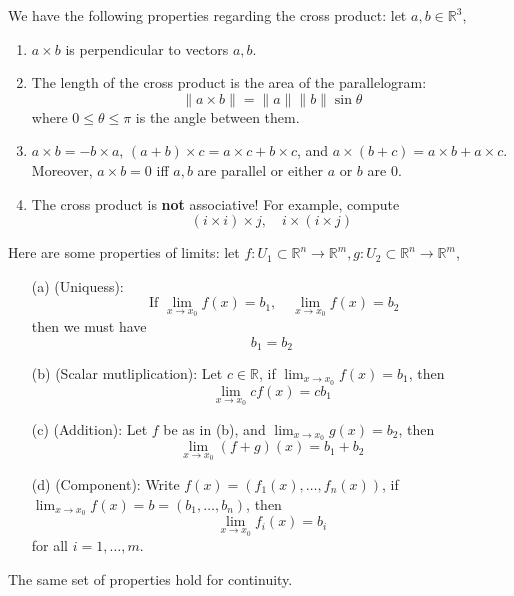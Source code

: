 \documentclass[openany]{book}
\newcommand{\R}{\mathbb{R}}
\begin{document}
\begin{prop}
    We have the following properties regarding the cross product: let $a,b\in\R^3$,
    \begin{enumerate}
        \item $a\times b$ is perpendicular to vectors $a,b$.
        \item The length of the cross product is the area of the parallelogram:
        \begin{equation*}
            \|a\times b\|=\|a\|\|b\|\sin\theta
        \end{equation*}
        where $0\leq\theta\leq\pi$ is the angle between them. 
        \item $a\times b=-b\times a$, $(a+b)\times c=a\times c+b\times c$, and $a\times (b+c)=a\times b+a\times c$. Moreover, $a\times b=0$ iff $a,b$ are parallel or either $a$ or $b$ are $0$.
        \item The cross product is \textbf{not} associative! For example, compute 
        \begin{equation*}
            (i\times i)\times j, \quad i\times (i\times j)
        \end{equation*}
    \end{enumerate}
\end{prop}



\begin{prop}[limits]
    Here are some properties of limits: let $f: U_1\subset\R^n\to\R^m, g: U_2\subset\R^n\to\R^m$,
    \begin{enumerate}
        \item[(a)] (Uniquess):  \begin{equation*}
            \text{ If } \lim_{x\to x_0}f(x)=b_1, \quad \lim_{x\to x_0}f(x)=b_2
        \end{equation*}
        then we must have 
        \begin{equation*}
            b_1=b_2
        \end{equation*}
        \item[(b)] (Scalar mutliplication): Let $c\in\R$, if $\lim_{x\to x_0}f(x)=b_1$, then 
        \begin{equation*}
            \lim_{x\to x_0}cf(x)=cb_1
        \end{equation*}
        \item[(c)] (Addition): Let $f$ be as in (b), and $\lim_{x\to x_0}g(x)=b_2$, then 
        \begin{equation*}
            \lim_{x\to x_0}(f+g)(x)=b_1+b_2
        \end{equation*}
        \item[(d)] (Component): Write $f(x)=(f_1(x),\dots, f_n(x))$, if $\lim_{x\to x_0}f(x)=b=(b_1,\dots, b_n)$, then 
        \begin{equation*}
            \lim_{x\to x_0}f_i(x)=b_i
        \end{equation*}
        for all $i=1,\dots, m$.
    \end{enumerate}
    The same set of properties hold for continuity.
\end{prop}
\end{document}
